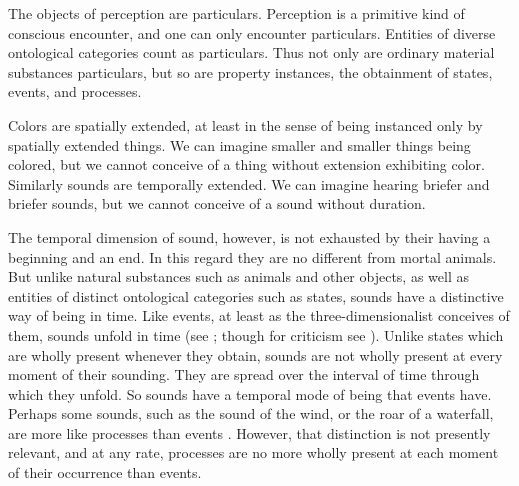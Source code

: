 The objects of perception are particulars. Perception is a primitive kind of conscious encounter, and one can only encounter particulars. Entities of diverse ontological categories count as particulars. Thus not only are ordinary material substances particulars, but so are property instances, the obtainment of states, events, and processes.

Colors are spatially extended, at least in the sense of being instanced only by spatially extended things. We can imagine smaller and smaller things being colored, but we cannot conceive of a thing without extension exhibiting color. Similarly sounds are temporally extended. We can imagine hearing briefer and briefer sounds, but we cannot conceive of a sound without duration. 

The temporal dimension of sound, however, is not exhausted by their having a beginning and an end. In this regard they are no different from mortal animals. But unlike natural substances such as animals and other objects, as well as entities of distinct ontological categories such as states, sounds have a distinctive way of being in time. Like events, at least as the three-dimensionalist conceives of them, sounds unfold in time (see \citealt{Fine:2006fk}; though for criticism see \citealt{Sider:1997fk,Hawthorne:2008uq}). Unlike states which are wholly present whenever they obtain, sounds are not wholly present at every moment of their sounding. They are spread over the interval of time through which they unfold. So sounds have a temporal mode of being that events have. Perhaps some sounds, such as the sound of the wind, or the roar of a waterfall, are more like processes than events \citep[4]{Broad:1952kx}. However, that distinction is not presently relevant, and at any rate, processes are no more wholly present at each moment of their occurrence than events. 

